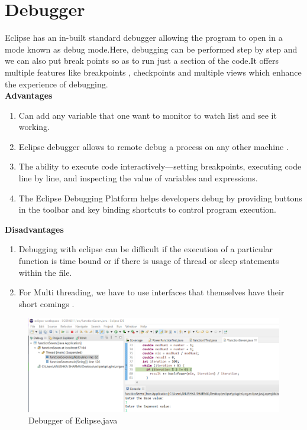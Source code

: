 \documentclass{article}
\begin{document}
\newpage
\section*{Debugger}
Eclipse has an in-built standard debugger allowing the program to open in a mode known as debug mode.Here, debugging can be performed step by step and we can also put break points so as to run just a section of the code.It offers multiple features like breakpoints , checkpoints and multiple views which enhance the experience of debugging.\\

\textbf{Advantages}

\begin{enumerate}
  \item Can add any variable that one want to monitor to watch list and see it working.\
  \item Eclipse debugger allows to remote debug a process on any other machine .\
  \item  The ability to execute code interactively—setting breakpoints, executing code line by line, and inspecting the value of variables and expressions.\
  \item The Eclipse Debugging Platform helps developers debug by providing buttons in the toolbar and key binding shortcuts to control program execution. \
\end{enumerate}

\textbf{Disadvantages}
\begin{enumerate}
\item Debugging with eclipse can be difficult if the execution of a particular function is time bound or if there is usage of thread or sleep statements within the file. \
\item For Multi threading, we have to use interfaces that themselves have their short comings . \\
\end{enumerate}
    \begin{figure}[htb]
    \centering
    \includegraphics[width=16cm]{debug}
    \caption{Debugger of Eclipse.java}
    \label{fig:galaxy}
\end{figure}
\end{document}
